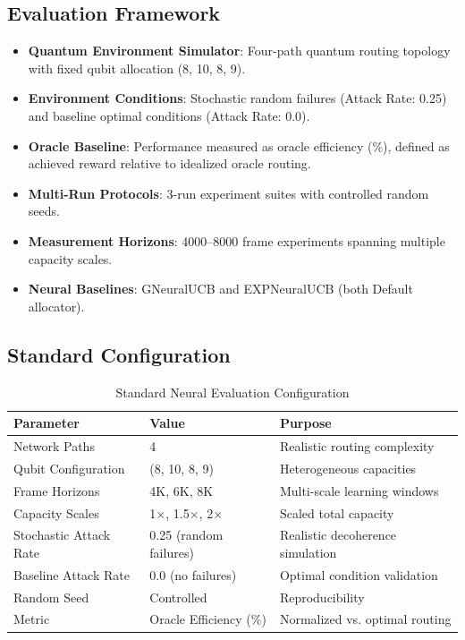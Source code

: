 \documentclass[12pt,a4paper]{article}
\begin{document}
\subsection{Evaluation Framework}
\begin{itemize}
\item \textbf{Quantum Environment Simulator}: Four-path quantum routing topology with fixed qubit allocation (8, 10, 8, 9).
\item \textbf{Environment Conditions}: Stochastic random failures (Attack Rate: 0.25) and baseline optimal conditions (Attack Rate: 0.0).
\item \textbf{Oracle Baseline}: Performance measured as oracle efficiency (\%), defined as achieved reward relative to idealized oracle routing.
\item \textbf{Multi-Run Protocols}: 3-run experiment suites with controlled random seeds.
\item \textbf{Measurement Horizons}: 4000--8000 frame experiments spanning multiple capacity scales.
\item \textbf{Neural Baselines}: GNeuralUCB and EXPNeuralUCB (both Default allocator).
\end{itemize}

\subsection{Standard Configuration}
\begin{table}[H]
\centering
\caption{Standard Neural Evaluation Configuration}
\begin{tabular}{@{}lll@{}}
\toprule
\textbf{Parameter} & \textbf{Value} & \textbf{Purpose} \\
\midrule
Network Paths & 4 & Realistic routing complexity \\
Qubit Configuration & (8, 10, 8, 9) & Heterogeneous capacities \\
Frame Horizons & 4K, 6K, 8K & Multi-scale learning windows \\
Capacity Scales & 1$\times$, 1.5$\times$, 2$\times$ & Scaled total capacity \\
Stochastic Attack Rate & 0.25 (random failures) & Realistic decoherence simulation \\
Baseline Attack Rate & 0.0 (no failures) & Optimal condition validation \\
Random Seed & Controlled & Reproducibility \\
Metric & Oracle Efficiency (\%) & Normalized vs. optimal routing \\
\bottomrule
\end{tabular}
\end{table}
\end{document}
